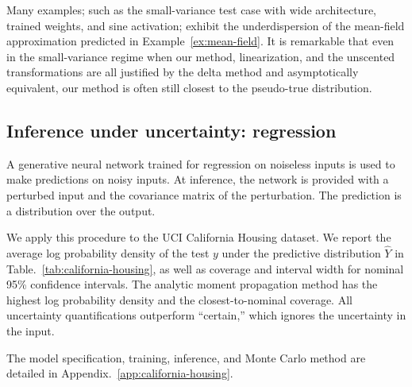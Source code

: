 \documentclass{article}
\begin{document}
Many examples; such as the small-variance test case with wide architecture, trained weights, and sine activation; exhibit the underdispersion of the mean-field approximation predicted in Example~\ref{ex:mean-field}.
It is remarkable that even in the small-variance regime when our method, linearization, and the unscented transformations are all justified by the delta method and asymptotically equivalent, our method is often still closest to the pseudo-true distribution.


\subsection{Inference under uncertainty: regression}
\label{sec:california-housing}
A generative neural network trained for regression on noiseless inputs is used to make predictions on noisy inputs.
At inference, the network is provided with a perturbed input and the covariance matrix of the perturbation.
The prediction is a distribution over the output.

We apply this procedure to the UCI California Housing dataset.
We report the average log probability density of the test \(y\) under the predictive distribution \(\hat Y\) in Table.~\ref{tab:california-housing}, as well as coverage and interval width for nominal 95\% confidence intervals.
The analytic moment propagation method  has the highest log probability density and the closest-to-nominal coverage.
All uncertainty quantifications outperform ``certain,'' which ignores the uncertainty in the input.

The model specification, training, inference, and Monte Carlo method are detailed in Appendix.~\ref{app:california-housing}.
\end{document}
